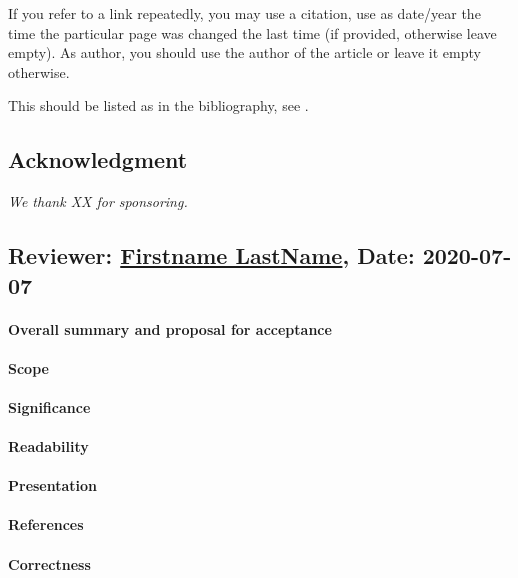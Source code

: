 \documentclass{jhps}
\begin{document}
If you refer to a link repeatedly, you may use a citation, use as date/year the time the particular page was changed the last time (if provided, otherwise leave empty).
As author, you should use the author of the article or leave it empty otherwise.

This should be listed as in the bibliography, see .
\begin{lstfloat}

\end{lstfloat}

\subsection*{Acknowledgment} %
\textit{We thank XX for sponsoring.}



\reviews   %

\subsection*{Reviewer: \href{Optional URL to reviewer page}{Firstname LastName}, Date: 2020-07-07}

\paragraph{Overall summary and proposal for acceptance}

\paragraph{Scope}   %

\paragraph{Significance}   %

\paragraph{Readability}   %

\paragraph{Presentation}

\paragraph{References}   %

\paragraph{Correctness}   %
\end{document}
